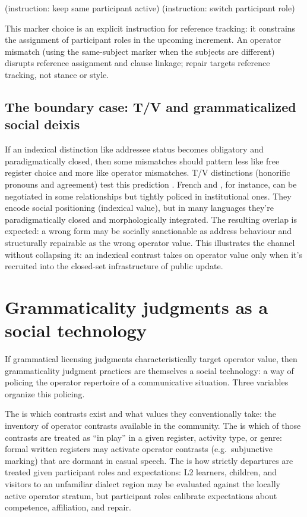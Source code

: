 \documentclass[12pt,letterpaper]{article}
\begin{document}
\ea
\begin{xlist}
\ex {} (instruction: keep same participant active)
\ex {} (instruction: switch participant role)
\end{xlist}
\z

This marker choice is an explicit instruction for reference tracking: it constrains the assignment of participant roles in the upcoming increment. An operator mismatch (using the same-subject marker when the subjects are different) disrupts reference assignment and clause linkage; repair targets reference tracking, not stance or style.

\subsection{The boundary case: T/V and grammaticalized social deixis}

If an indexical distinction like addressee status becomes obligatory and paradigmatically closed, then some mismatches should pattern less like free register choice and more like operator mismatches. T/V distinctions (honorific pronouns and agreement) test this prediction \citep{browngilman1960,helmbrecht2013}. French  and , for instance, can be negotiated in some relationships but tightly policed in institutional ones. They encode social positioning (indexical value), but in many languages they're paradigmatically closed and morphologically integrated. The resulting overlap is expected: a wrong form may be socially sanctionable as address behaviour and structurally repairable as the wrong operator value. This illustrates the channel without collapsing it: an indexical contrast takes on operator value only when it's recruited into the closed-set infrastructure of public update.

\section{Grammaticality judgments as a social technology}
\label{sec:social-technology}

If grammatical licensing judgments characteristically target operator value, then grammaticality judgment practices are themselves a social technology: a way of policing the operator repertoire of a communicative situation. Three variables organize this policing.

The  is which contrasts exist and what values they conventionally take: the inventory of operator contrasts available in the community. The  is which of those contrasts are treated as \enquote{in play} in a given register, activity type, or genre: formal written registers may activate operator contrasts (e.g.\ subjunctive marking) that are dormant in casual speech. The  is how strictly departures are treated given participant roles and expectations: L2 learners, children, and visitors to an unfamiliar dialect region may be evaluated against the locally active operator stratum, but participant roles calibrate expectations about competence, affiliation, and repair.
\end{document}
